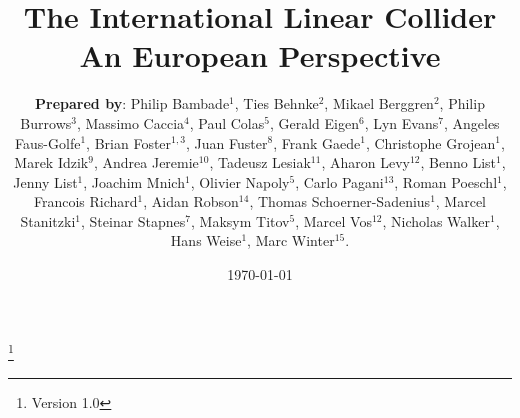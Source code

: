 \documentclass[%
 reprint,
 floatfix,
 amsmath,amssymb,
 aps,
]{revtex4-1}
\begin{document}

\title{The International Linear Collider \\ An European Perspective}%
\thanks{Version 1.0}%

\author{\textbf{Prepared by}:
Philip Bambade$^1$,  Ties Behnke$^2$, Mikael Berggren$^2$, Philip Burrows$^3$, Massimo Caccia$^{4}$, Paul Colas$^{5}$, Gerald Eigen$^{6}$, Lyn Evans$^{7}$, Angeles Faus-Golfe$^{1}$, Brian Foster$^{1,3}$, Juan Fuster$^{8}$, Frank Gaede$^{1}$, Christophe Grojean$^{1}$, Marek Idzik$^{9}$, Andrea Jeremie$^{10}$, Tadeusz Lesiak$^{11}$, Aharon Levy$^{12}$, Benno List$^{1}$, Jenny List$^{1}$, Joachim Mnich$^{1}$, Olivier Napoly$^{5}$, Carlo Pagani$^{13}$, Roman Poeschl$^{1}$, Francois Richard$^{1}$, Aidan Robson$^{14}$, Thomas Schoerner-Sadenius$^{1}$, Marcel Stanitzki$^1$, Steinar Stapnes$^{7}$, Maksym Titov$^{5}$, Marcel Vos$^{12}$, Nicholas Walker$^{1}$, Hans Weise$^{1}$, Marc Winter$^{15}$. }




\date{\today}%
\end{document}
